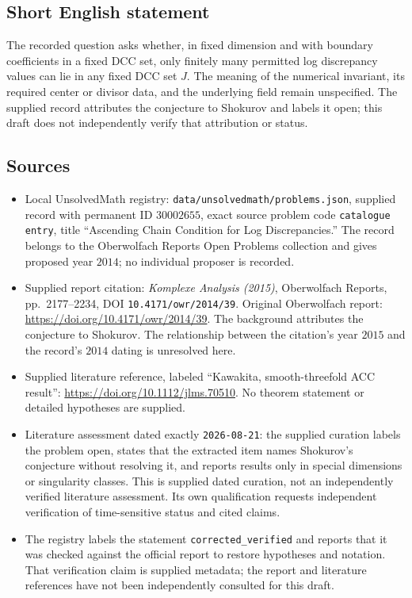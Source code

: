 \documentclass[11pt]{article}
\begin{document}
\subsection{Short English statement}
The recorded question asks whether, in fixed dimension and with boundary coefficients in a fixed DCC set, only finitely many permitted log discrepancy values can lie in any fixed DCC set \(J\). The meaning of the numerical invariant, its required center or divisor data, and the underlying field remain unspecified. The supplied record attributes the conjecture to Shokurov and labels it open; this draft does not independently verify that attribution or status.
\subsection{Sources}
\begin{itemize}
\item Local UnsolvedMath registry: \texttt{data/unsolvedmath/problems.json}, supplied record with permanent ID \(30002655\), exact source problem code \texttt{catalogue entry}, title ``Ascending Chain Condition for Log Discrepancies.'' The record belongs to the Oberwolfach Reports Open Problems collection and gives proposed year \(2014\); no individual proposer is recorded.
\item Supplied report citation: \emph{Komplexe Analysis (2015)}, Oberwolfach Reports, pp.\ 2177--2234, DOI \texttt{10.4171/owr/2014/39}. Original Oberwolfach report: \url{https://doi.org/10.4171/owr/2014/39}. The background attributes the conjecture to Shokurov. The relationship between the citation's year \(2015\) and the record's \(2014\) dating is unresolved here.
\item Supplied literature reference, labeled ``Kawakita, smooth-threefold ACC result'': \url{https://doi.org/10.1112/jlms.70510}. No theorem statement or detailed hypotheses are supplied.
\item Literature assessment dated exactly \texttt{2026-08-21}: the supplied curation labels the problem open, states that the extracted item names Shokurov's conjecture without resolving it, and reports results only in special dimensions or singularity classes. This is supplied dated curation, not an independently verified literature assessment. Its own qualification requests independent verification of time-sensitive status and cited claims.
\item The registry labels the statement \texttt{corrected\_verified} and reports that it was checked against the official report to restore hypotheses and notation. That verification claim is supplied metadata; the report and literature references have not been independently consulted for this draft.
\end{itemize}
\end{document}
